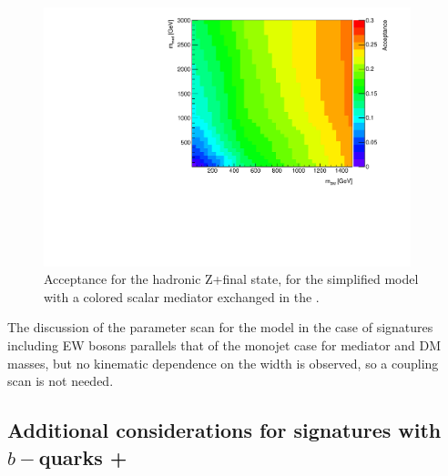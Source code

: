 \begin{figure}[h!]
	\centering  
	\includegraphics[width=0.95\textwidth]{figures/EW/monoZhad_TChannel/TChan_newplot.pdf}
	\caption{Acceptance for the hadronic Z+\MET final state,
		for the simplified model with a colored scalar mediator exchanged in the \tchannel.}
	\label{fig:TChan_EW_Zhad_acc}
\end{figure}

The discussion of the parameter scan for the \tchannel model
in the case of signatures including EW bosons
parallels that of the monojet case for mediator and DM masses,
but no kinematic dependence on the width is observed, so a coupling scan is not needed. 


%
%

 \subsection{\texorpdfstring{Additional considerations for signatures with $b-$quarks + \MET}{Additional considerations for signatures  with b-quarks + \MET}}
 \label{sec:singleb}
 
